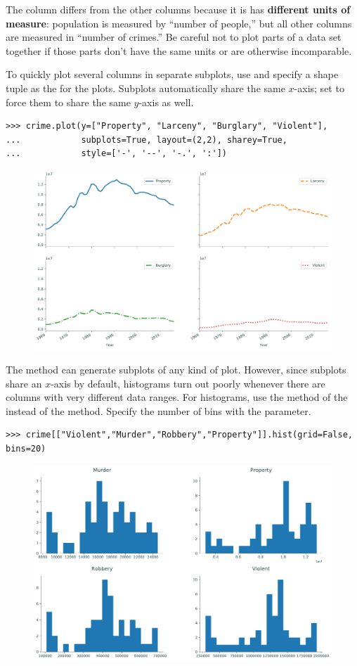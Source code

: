 \begin{warn}
The  column differs from the other columns because it is has \textbf{different units of measure}: population is measured by ``number of people,'' but all other columns are measured in ``number of crimes.''
Be careful not to plot parts of a data set together if those parts don't have the same units or are otherwise incomparable.
\end{warn}

To quickly plot several columns in separate subplots, use  and specify a shape tuple as the  for the plots.
Subplots automatically share the same $x$-axis; set  to force them to share the same $y$-axis as well.

\begin{lstlisting}
>>> crime.plot(y=["Property", "Larceny", "Burglary", "Violent"],
...            subplots=True, layout=(2,2), sharey=True,
...            style=['-', '--', '-.', ':'])
\end{lstlisting}

\begin{figure}[H]
    \includegraphics[width=.7\textwidth]{figures/line_subplots.pdf}
\end{figure}

The  method can generate subplots of any kind of plot.
However, since subplots share an $x$-axis by default, histograms turn out poorly whenever there are columns with very different data ranges.
For histograms, use the  method of the  instead of the  method.
Specify the number of bins with the  parameter.

\begin{lstlisting}
>>> crime[["Violent","Murder","Robbery","Property"]].hist(grid=False, bins=20)
\end{lstlisting}

\begin{figure}[H]
    \includegraphics[width=.7\textwidth]{figures/hist_subplots.pdf}
\end{figure}

